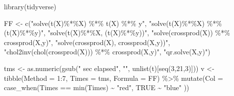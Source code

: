 \documentclass[
  letterpaper,
]{book}
\newenvironment{Shaded}{\begin{snugshade}}{\end{snugshade}}
\newcommand{\AttributeTok}[1]{\textcolor[rgb]{0.40,0.45,0.13}{#1}}
\newcommand{\ConstantTok}[1]{\textcolor[rgb]{0.56,0.35,0.01}{#1}}
\newcommand{\DecValTok}[1]{\textcolor[rgb]{0.68,0.00,0.00}{#1}}
\newcommand{\FunctionTok}[1]{\textcolor[rgb]{0.28,0.35,0.67}{#1}}
\newcommand{\NormalTok}[1]{\textcolor[rgb]{0.00,0.23,0.31}{#1}}
\newcommand{\OtherTok}[1]{\textcolor[rgb]{0.00,0.23,0.31}{#1}}
\newcommand{\SpecialCharTok}[1]{\textcolor[rgb]{0.37,0.37,0.37}{#1}}
\newcommand{\StringTok}[1]{\textcolor[rgb]{0.13,0.47,0.30}{#1}}
\begin{document}
\begin{Shaded}
\begin{Highlighting}[]
\FunctionTok{library}\NormalTok{(tidyverse)}

\NormalTok{FF }\OtherTok{\textless{}{-}} \FunctionTok{c}\NormalTok{(}\StringTok{"solve(t(X)\%*\%X) \%*\% t(X) \%*\% y"}\NormalTok{,}
        \StringTok{"solve(t(X)\%*\%X) \%*\% (t(X)\%*\%y)"}\NormalTok{,}
        \StringTok{"solve(t(X)\%*\%X, (t(X)\%*\%y))"}\NormalTok{,}
        \StringTok{"solve(crossprod(X)) \%*\% crossprod(X,y)"}\NormalTok{,}
        \StringTok{"solve(crossprod(X), crossprod(X,y))"}\NormalTok{,}
        \StringTok{"chol2inv(chol(crossprod(X))) \%*\% crossprod(X,y)"}\NormalTok{,}
        \StringTok{"qr.solve(X,y)"}\NormalTok{)}

\NormalTok{tms }\OtherTok{\textless{}{-}} \FunctionTok{as.numeric}\NormalTok{(}\FunctionTok{gsub}\NormalTok{(}\StringTok{" sec elapsed"}\NormalTok{, }\StringTok{""}\NormalTok{, }\FunctionTok{unlist}\NormalTok{(t)[}\FunctionTok{seq}\NormalTok{(}\DecValTok{3}\NormalTok{,}\DecValTok{21}\NormalTok{,}\DecValTok{3}\NormalTok{)]))}
\NormalTok{v   }\OtherTok{\textless{}{-}} \FunctionTok{tibble}\NormalTok{(}\AttributeTok{Method  =} \DecValTok{1}\SpecialCharTok{:}\DecValTok{7}\NormalTok{, }
              \AttributeTok{Times   =}\NormalTok{ tms,}
              \AttributeTok{Formula =}\NormalTok{ FF) }\SpecialCharTok{\%\textgreater{}\%} 
  \FunctionTok{mutate}\NormalTok{(}\AttributeTok{Col =} \FunctionTok{case\_when}\NormalTok{(Times }\SpecialCharTok{==} \FunctionTok{min}\NormalTok{(Times) }\SpecialCharTok{\textasciitilde{}} \StringTok{"red"}\NormalTok{,}
                         \ConstantTok{TRUE} \SpecialCharTok{\textasciitilde{}} \StringTok{"blue"}
\NormalTok{  ))}


\end{Highlighting}
\end{Shaded}
\end{document}
